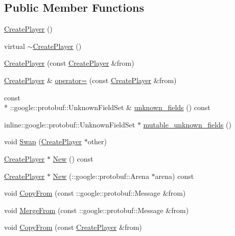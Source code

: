 \subsection*{Public Member Functions}
\begin{DoxyCompactItemize}
\item 
\hyperlink{class_create_player_a7ca0994ddaaa35300043d7106c0b076a}{Create\-Player} ()
\item 
virtual \hyperlink{class_create_player_a9c964a79e85b65a5d1d8b363f8b770ca}{$\sim$\-Create\-Player} ()
\item 
\hyperlink{class_create_player_a5467ecbd35d70d79efdb29585750ebdd}{Create\-Player} (const \hyperlink{class_create_player}{Create\-Player} \&from)
\item 
\hyperlink{class_create_player}{Create\-Player} \& \hyperlink{class_create_player_a6d76729d94045fa53266443aa470a0fa}{operator=} (const \hyperlink{class_create_player}{Create\-Player} \&from)
\item 
const \\*
\-::google\-::protobuf\-::\-Unknown\-Field\-Set \& \hyperlink{class_create_player_ae9037e8587010e7098b08f04baddf82a}{unknown\-\_\-fields} () const 
\item 
inline\-::google\-::protobuf\-::\-Unknown\-Field\-Set $\ast$ \hyperlink{class_create_player_ae68cce2fe165a57865c55ea1df283b1c}{mutable\-\_\-unknown\-\_\-fields} ()
\item 
void \hyperlink{class_create_player_a4e03e69e9f10d6a793e116e8234959cf}{Swap} (\hyperlink{class_create_player}{Create\-Player} $\ast$other)
\item 
\hyperlink{class_create_player}{Create\-Player} $\ast$ \hyperlink{class_create_player_ac32d4379f1fb60282feb65513c673739}{New} () const 
\item 
\hyperlink{class_create_player}{Create\-Player} $\ast$ \hyperlink{class_create_player_acce271bc0b594deb9186de689a991b5b}{New} (\-::google\-::protobuf\-::\-Arena $\ast$arena) const 
\item 
void \hyperlink{class_create_player_afa1a1c65463f21a36c60c624a2830f8b}{Copy\-From} (const \-::google\-::protobuf\-::\-Message \&from)
\item 
void \hyperlink{class_create_player_ac69c59b01e955b2f6b54b187d37645a4}{Merge\-From} (const \-::google\-::protobuf\-::\-Message \&from)
\item 
void \hyperlink{class_create_player_a6a7ceed0bae191b7507404dee9440860}{Copy\-From} (const \hyperlink{class_create_player}{Create\-Player} \&from)
\item 

\end{DoxyCompactItemize}
